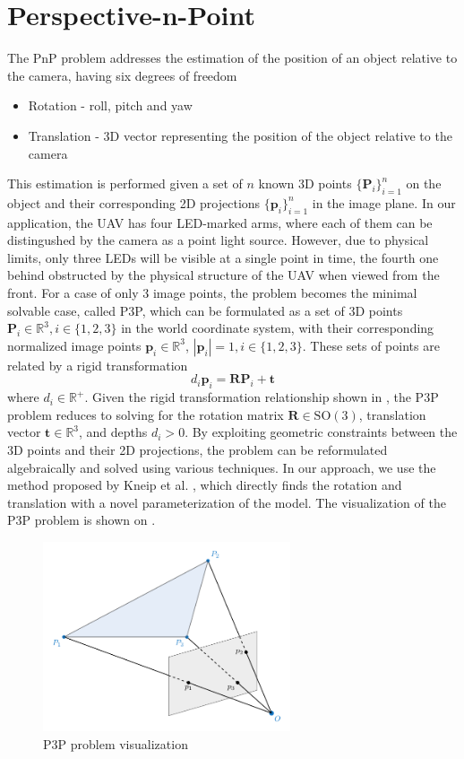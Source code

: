 \section{Perspective-n-Point}
The \ac{PnP} problem addresses the estimation of the position of an object relative to the camera, having six degrees of freedom
\begin{itemize}
\item{Rotation - roll, pitch and yaw}
\item{Translation - 3D vector representing the position of the object relative to the camera}
\end{itemize}
This estimation is performed given a set of $n$ known 3D points $\{\mathbf{P}_i\}_{i=1}^n$ on the object and their corresponding 2D projections $\{\mathbf{p}_i\}_{i=1}^n$ in the image plane.
In our application, the UAV has four \ac{LED}-marked arms, where each of them can be distingushed by the camera as a point light source.
However, due to physical limits, only three \ac{LED}s will be visible at a single point in time, the fourth one behind obstructed by the physical structure of the \ac{UAV} when viewed from the front.
For a case of only 3 image points, the problem becomes the minimal solvable case, called \ac{P3P}, which 
can be formulated as a set of 3D points $\textbf{P}_i \in \mathbb{R}^{3}, i \in \{1, 2, 3\}$ in the world coordinate system, with their corresponding normalized image points
$\textbf{p}_i \in \mathbb{R}^{3}$, $|\textbf{p}_i|=1, i \in \{1, 2, 3\}$. These sets of points are related by a rigid transformation \cite{Ding_2023_CVPR}
\begin{equation}
d_i \textbf{p}_i = \textbf{R} \textbf{P}_i + \textbf{t}
\label{eq:p3p}
\end{equation}
where $d_i \in \mathbb{R}^+$.
Given the rigid transformation relationship shown in , the \ac{P3P} problem reduces to solving for the rotation matrix 
$\mathbf{R} \in \text{SO}(3)$, translation vector $\mathbf{t} \in \mathbb{R}^3$, and depths $d_i > 0$. 
By exploiting geometric constraints between the 3D points and their 2D projections, the problem can be
reformulated algebraically and solved using various techniques. In our approach, we use the method proposed by Kneip et al. \cite{kneip}, which
directly finds the rotation and translation with a novel parameterization of the model.
The visualization of the \ac{P3P} problem is shown on .
\begin{figure}[H]
	\centering
	\includegraphics[width=0.65\textwidth]{./fig/tikz/p3p.pdf}
	\caption{P3P problem visualization}
	\label{fig:p3p}
\end{figure}
